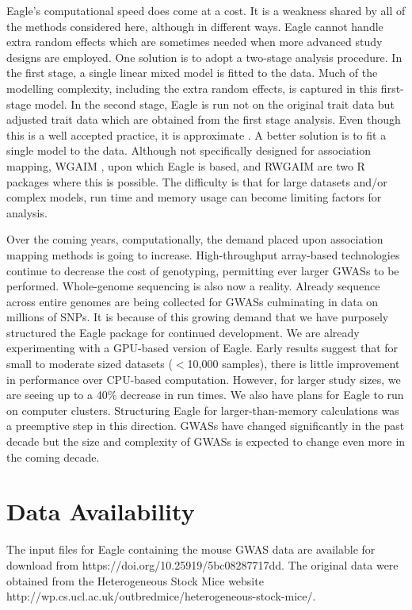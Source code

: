 \documentclass{article}
\begin{document}
Eagle's computational speed does come at a cost. It is a weakness shared by all of the methods considered here, although in different ways. 
Eagle cannot handle extra random effects which are sometimes needed when more advanced study designs are employed. One solution 
is to adopt a two-stage analysis procedure. In the first stage, a single linear mixed model is fitted to the data. Much of the modelling complexity, 
including the extra random effects, is 
captured in this first-stage model. In the second stage, Eagle is run not on the original trait data but adjusted trait data which are obtained from the first stage analysis. Even though this is a well accepted practice, it is approximate \citep{gogel2018comparison}.  A better solution is to fit a single model to the data. 
Although not specifically designed for association mapping,
WGAIM \citep{verbyla2007analysis}, upon which Eagle is based, and RWGAIM \citep{verbyla2012rwgaim}  are two R packages where this is possible. The difficulty is that for large datasets and/or complex 
models,  run time and memory usage can become limiting factors for analysis. 


Over the coming years, computationally, the demand placed upon association mapping methods is going to increase. 
High-throughput array-based technologies continue to decrease the cost of genotyping, permitting ever larger GWASs to be performed. 
Whole-genome sequencing is also now a reality. Already sequence across entire genomes are being collected for GWASs \citep{gudbjartsson2015large, long2017whole}
culminating in data on millions of SNPs. It is because of this growing demand that 
we have purposely structured the Eagle package for continued development. We are already experimenting with a GPU-based version of Eagle. 
Early results suggest that for small to moderate sized datasets ($<$10,000 samples), there is little improvement in performance over CPU-based 
computation.  However, for larger study sizes, we are seeing up to a 40\% decrease in run times.  
We also have plans for Eagle to run on computer clusters. Structuring Eagle for larger-than-memory calculations was a 
preemptive step in this direction. GWASs have changed significantly in the past decade but the size and complexity of GWASs is expected 
to change even more in the coming decade. 





\section*{Data Availability}
The input files for Eagle containing the mouse GWAS data are available for download from 
https://doi.org/10.25919/5bc08287717dd. The original data were obtained from the Heterogeneous Stock Mice website 
http://wp.cs.ucl.ac.uk/outbredmice/heterogeneous-stock-mice/.  
\end{document}
